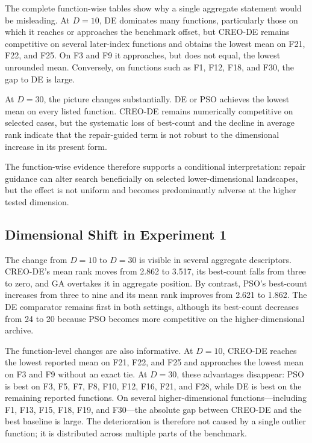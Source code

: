\documentclass[journal]{IEEEtran}
\begin{document}
The complete function-wise tables show why a single aggregate statement would be misleading. At $D=10$, DE dominates many functions, particularly those on which it reaches or approaches the benchmark offset, but CREO-DE remains competitive on several later-index functions and obtains the lowest mean on F21, F22, and F25. On F3 and F9 it approaches, but does not equal, the lowest unrounded mean. Conversely, on functions such as F1, F12, F18, and F30, the gap to DE is large.

At $D=30$, the picture changes substantially. DE or PSO achieves the lowest mean on every listed function. CREO-DE remains numerically competitive on selected cases, but the systematic loss of best-count and the decline in average rank indicate that the repair-guided term is not robust to the dimensional increase in its present form.

The function-wise evidence therefore supports a conditional interpretation: repair guidance can alter search beneficially on selected lower-dimensional landscapes, but the effect is not uniform and becomes predominantly adverse at the higher tested dimension.

\subsection{Dimensional Shift in Experiment 1}

The change from $D=10$ to $D=30$ is visible in several aggregate descriptors. CREO-DE's mean rank moves from 2.862 to 3.517, its best-count falls from three to zero, and GA overtakes it in aggregate position. By contrast, PSO's best-count increases from three to nine and its mean rank improves from 2.621 to 1.862. The DE comparator remains first in both settings, although its best-count decreases from 24 to 20 because PSO becomes more competitive on the higher-dimensional archive.

The function-level changes are also informative. At $D=10$, CREO-DE reaches the lowest reported mean on F21, F22, and F25 and approaches the lowest mean on F3 and F9 without an exact tie. At $D=30$, these advantages disappear: PSO is best on F3, F5, F7, F8, F10, F12, F16, F21, and F28, while DE is best on the remaining reported functions. On several higher-dimensional functions---including F1, F13, F15, F18, F19, and F30---the absolute gap between CREO-DE and the best baseline is large. The deterioration is therefore not caused by a single outlier function; it is distributed across multiple parts of the benchmark.
\end{document}
